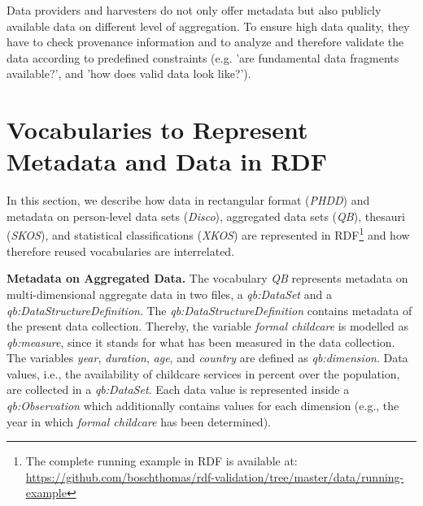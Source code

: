 \documentclass{llncs}
\begin{document}
Data providers and harvesters do not only offer metadata but also publicly available data on different level of aggregation.
To ensure high data quality, they have to check provenance information and to analyze and therefore validate the data according to predefined constraints (e.g. 'are fundamental data fragments available?', and 'how does valid data look like?'). 

\section{Vocabularies to Represent Metadata and Data in RDF}
\label{rdf-representation}

In this section, we describe how data in rectangular format (\emph{PHDD}) and metadata on person-level data sets (\emph{Disco}), aggregated data sets (\emph{QB}), thesauri (\emph{SKOS}), and statistical classifications (\emph{XKOS}) are represented in RDF\footnote{The complete running example in RDF is available at: \url{https://github.com/boschthomas/rdf-validation/tree/master/data/running-example}} and how therefore reused vocabularies are interrelated.

\textbf{Metadata on Aggregated Data.}
The vocabulary \emph{QB} represents metadata on multi-dimensional aggregate data in two files, a \emph{qb:DataSet} and a \emph{qb:DataStructureDefinition}.
The \emph{qb:DataStructureDefinition} contains metadata of the present data collection.
Thereby, the variable \emph{formal childcare} is modelled as \emph{qb:measure}, since it stands for what has been measured in the data collection.
The variables \emph{year}, \emph{duration}, \emph{age}, and \emph{country} are defined as \emph{qb:dimension}.
Data values, i.e., the availability of childcare services in percent over the population, are collected in a \emph{qb:DataSet}. 
Each data value is represented inside a \emph{qb:Observation} which additionally contains values for each dimension 
(e.g., the year in which \emph{formal childcare} has been determined).
\end{document}
